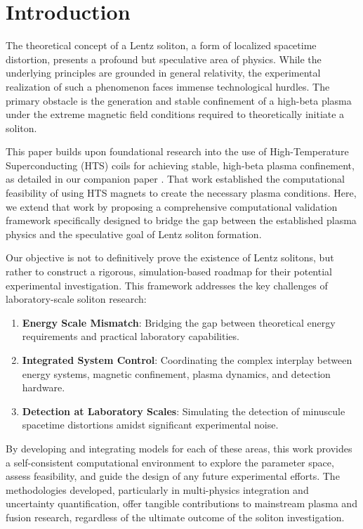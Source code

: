 \documentclass[12pt,a4paper]{article}
\begin{document}
\section{Introduction}

The theoretical concept of a Lentz soliton, a form of localized spacetime distortion, presents a profound but speculative area of physics. While the underlying principles are grounded in general relativity, the experimental realization of such a phenomenon faces immense technological hurdles. The primary obstacle is the generation and stable confinement of a high-beta plasma under the extreme magnetic field conditions required to theoretically initiate a soliton.

This paper builds upon foundational research into the use of High-Temperature Superconducting (HTS) coils for achieving stable, high-beta plasma confinement, as detailed in our companion paper \cite{HTSPlasmaConfinement2025}. That work established the computational feasibility of using HTS magnets to create the necessary plasma conditions. Here, we extend that work by proposing a comprehensive computational validation framework specifically designed to bridge the gap between the established plasma physics and the speculative goal of Lentz soliton formation.

Our objective is not to definitively prove the existence of Lentz solitons, but rather to construct a rigorous, simulation-based roadmap for their potential experimental investigation. This framework addresses the key challenges of laboratory-scale soliton research:
\begin{enumerate}
    \item \textbf{Energy Scale Mismatch}: Bridging the gap between theoretical energy requirements and practical laboratory capabilities.
    \item \textbf{Integrated System Control}: Coordinating the complex interplay between energy systems, magnetic confinement, plasma dynamics, and detection hardware.
    \item \textbf{Detection at Laboratory Scales}: Simulating the detection of minuscule spacetime distortions amidst significant experimental noise.
\end{enumerate}

By developing and integrating models for each of these areas, this work provides a self-consistent computational environment to explore the parameter space, assess feasibility, and guide the design of any future experimental efforts. The methodologies developed, particularly in multi-physics integration and uncertainty quantification, offer tangible contributions to mainstream plasma and fusion research, regardless of the ultimate outcome of the soliton investigation.
\end{document}

